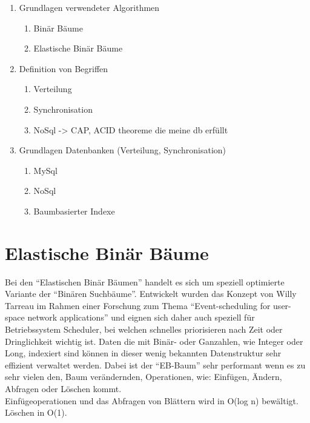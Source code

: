 \documentclass[a4paper,11pt,oneside,%
headsepline,												%
footsepline,												%
bibtotocnumbered									%
]{scrreprt}
\begin{document}
	\begin{enumerate}[1.]
			\item Grundlagen verwendeter Algorithmen
				\begin{enumerate}[1.]
					\item Binär Bäume
					\item Elastische Binär Bäume
				\end{enumerate}
			\item Definition von Begriffen
				\begin{enumerate}[1.]
					\item Verteilung
					\item Synchronisation
					\item NoSql -> CAP, ACID theoreme die meine db erfüllt 
				\end{enumerate}
			\item Grundlagen Datenbanken (Verteilung, Synchronisation)
				\begin{enumerate}[1.]
					\item MySql
					\item NoSql 
					\item Baumbasierter Indexe
				\end{enumerate}
	\end{enumerate}

\section{Elastische Binär Bäume}
\label{sec:ebTreeGrundlagen}
Bei den \enquote{Elastischen Binär Bäumen} handelt es sich um speziell optimierte Variante der \enquote{Binären Suchbäume}. Entwickelt wurden das Konzept von Willy Tarreau\autocite{Tarreau} im Rahmen einer Forschung zum Thema \enquote{Event-scheduling for user-space network applications} und eignen sich daher auch speziell für Betriebssystem Scheduler, bei welchen schnelles priorisieren nach Zeit oder Dringlichkeit wichtig ist. Daten die mit Binär- oder Ganzahlen, wie Integer oder Long, indexiert sind können in dieser wenig bekannten Datenstruktur sehr effizient verwaltet werden. Dabei ist der \enquote{\ac{EB-Baum}} sehr performant wenn es zu sehr vielen den, Baum verändernden, Operationen, wie: Einfügen, Ändern, Abfragen oder Löschen kommt.\\
Einfügeoperationen und das Abfragen von Blättern wird in O(log n) bewältigt. Löschen in O(1).\\
\end{document}
